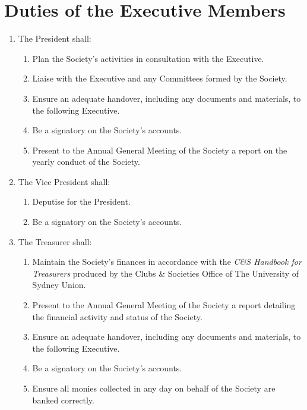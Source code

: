 \documentclass[11pt]{article}
\begin{document}
\section{Duties of the Executive Members}
\begin{enumerate}[\thesection .1]
    \item The President shall:
    \begin{enumerate}
        \item Plan the Society’s activities in consultation with the Executive.
        \item Liaise with the Executive and any Committees formed by the Society.	
        \item Ensure an adequate handover, including any documents and materials, to the following Executive.
        \item Be a signatory on the Society’s accounts.
        \item Present to the Annual General Meeting of the Society a report on the yearly conduct of the Society.
    \end{enumerate}
    \item The Vice President shall:
    \begin{enumerate}
        \item Deputise for the President.
        \item Be a signatory on the Society’s accounts.
    \end{enumerate}
    \item The Treasurer shall:
    \begin{enumerate}[\hspace{5mm}5.3.1]
        \item Maintain the Society’s finances in accordance with the \textit{C\&S Handbook for Treasurers} produced by the Clubs \& Societies Office of The University of Sydney Union.
        \item Present to the Annual General Meeting of the Society a report detailing the financial activity and status of the Society.
        \item Ensure an adequate handover, including any documents and materials, to the following Executive.
        \item Be a signatory on the Society’s accounts.
        \item Ensure all monies collected in any day on behalf of the Society are banked correctly.

\end{enumerate}
\end{enumerate}
\end{document}

